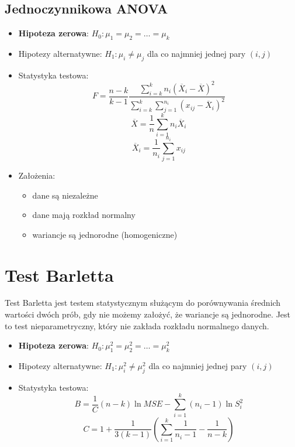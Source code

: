 \documentclass{../notatki}
\begin{document}
\subsection{Jednoczynnikowa ANOVA}

\begin{itemize}
  \item \textbf{Hipoteza zerowa}: $H_0: \mu_1 = \mu_2 = \ldots = \mu_k$
  \item Hipotezy alternatywne: $H_1: \mu_i \neq \mu_j$ dla co najmniej
    jednej pary $(i, j)$
  \item Statystyka testowa:
    $$
    F = \frac{n - k}{k - 1} \frac{\sum_{i=k}^k n_i(\overline{X}_i -
    \overline{X})^2}{\sum_{i=k}^k \sum_{j=1}^{n_i} (x_{ij} - \overline{X}_i)^2}
    $$
    $$
    \overline{X} = \frac{1}{n} \sum_{i=1}^k n_i \overline{X}_i
    $$
    $$
    \overline{X}_i = \frac{1}{n_i} \sum_{j=1}^{n_i} x_{ij}
    $$
  \item Założenia:
    \begin{itemize}
      \item dane są niezależne
      \item dane mają rozkład normalny
      \item wariancje są jednorodne (homogeniczne)
    \end{itemize}
\end{itemize}

\section{Test Barletta}

Test Barletta jest testem statystycznym służącym do porównywania
średnich wartości dwóch prób, gdy nie możemy założyć, że wariancje
są jednorodne. Jest to test nieparametryczny, który nie zakłada
rozkładu normalnego danych.

\begin{itemize}
  \item \textbf{Hipoteza zerowa}: $H_0: \mu_1^2 = \mu_2^2 = \ldots = \mu_k^2$
  \item Hipotezy alternatywne: $H_1: \mu_i^2 \neq \mu_j^2$ dla co najmniej
    jednej pary $(i, j)$
  \item Statystyka testowa:
    $$
    B = \frac{1}{C} (n - k) \ln MSE - \sum_{i=1}^k (n_i - 1) \ln S_i^2
    $$
    $$
    C = 1 + \frac{1}{3(k - 1)}(\sum_{i=1}^k \frac{1}{n_i - 1} - \frac{1}{n - k})
    $$
\end{itemize}

\end{document}
